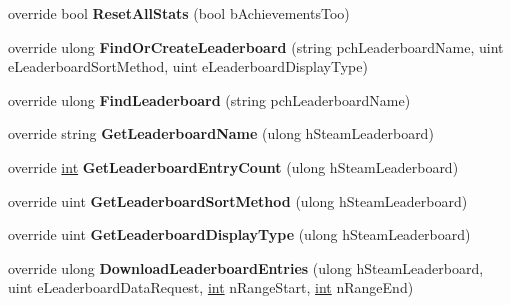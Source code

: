 \begin{DoxyCompactItemize}
\item 
\hypertarget{classValve_1_1Steamworks_1_1CSteamUserStats_a482f752c475972c9a3c5fbe538cecb6d}{}override bool {\bfseries Reset\+All\+Stats} (bool b\+Achievements\+Too)\label{classValve_1_1Steamworks_1_1CSteamUserStats_a482f752c475972c9a3c5fbe538cecb6d}

\item 
\hypertarget{classValve_1_1Steamworks_1_1CSteamUserStats_a43a10df1eb115032bc1a454bf732ed5d}{}override ulong {\bfseries Find\+Or\+Create\+Leaderboard} (string pch\+Leaderboard\+Name, uint e\+Leaderboard\+Sort\+Method, uint e\+Leaderboard\+Display\+Type)\label{classValve_1_1Steamworks_1_1CSteamUserStats_a43a10df1eb115032bc1a454bf732ed5d}

\item 
\hypertarget{classValve_1_1Steamworks_1_1CSteamUserStats_a3238c41191aad7c5fae249d524a865f2}{}override ulong {\bfseries Find\+Leaderboard} (string pch\+Leaderboard\+Name)\label{classValve_1_1Steamworks_1_1CSteamUserStats_a3238c41191aad7c5fae249d524a865f2}

\item 
\hypertarget{classValve_1_1Steamworks_1_1CSteamUserStats_aa58850cb3fc5cfe8d607195822df979c}{}override string {\bfseries Get\+Leaderboard\+Name} (ulong h\+Steam\+Leaderboard)\label{classValve_1_1Steamworks_1_1CSteamUserStats_aa58850cb3fc5cfe8d607195822df979c}

\item 
\hypertarget{classValve_1_1Steamworks_1_1CSteamUserStats_aa383f7b3ff6ec78c16216f877a11b6e3}{}override \hyperlink{SDL__thread_8h_a6a64f9be4433e4de6e2f2f548cf3c08e}{int} {\bfseries Get\+Leaderboard\+Entry\+Count} (ulong h\+Steam\+Leaderboard)\label{classValve_1_1Steamworks_1_1CSteamUserStats_aa383f7b3ff6ec78c16216f877a11b6e3}

\item 
\hypertarget{classValve_1_1Steamworks_1_1CSteamUserStats_ac12a38df6ea6979a66bc0f238728c6e8}{}override uint {\bfseries Get\+Leaderboard\+Sort\+Method} (ulong h\+Steam\+Leaderboard)\label{classValve_1_1Steamworks_1_1CSteamUserStats_ac12a38df6ea6979a66bc0f238728c6e8}

\item 
\hypertarget{classValve_1_1Steamworks_1_1CSteamUserStats_a0f4b537041692362a511d8cc5fc90f5e}{}override uint {\bfseries Get\+Leaderboard\+Display\+Type} (ulong h\+Steam\+Leaderboard)\label{classValve_1_1Steamworks_1_1CSteamUserStats_a0f4b537041692362a511d8cc5fc90f5e}

\item 
\hypertarget{classValve_1_1Steamworks_1_1CSteamUserStats_a3b07fb4c25cad587ea3b83822c29fe1e}{}override ulong {\bfseries Download\+Leaderboard\+Entries} (ulong h\+Steam\+Leaderboard, uint e\+Leaderboard\+Data\+Request, \hyperlink{SDL__thread_8h_a6a64f9be4433e4de6e2f2f548cf3c08e}{int} n\+Range\+Start, \hyperlink{SDL__thread_8h_a6a64f9be4433e4de6e2f2f548cf3c08e}{int} n\+Range\+End)\label{classValve_1_1Steamworks_1_1CSteamUserStats_a3b07fb4c25cad587ea3b83822c29fe1e}


\end{DoxyCompactItemize}
